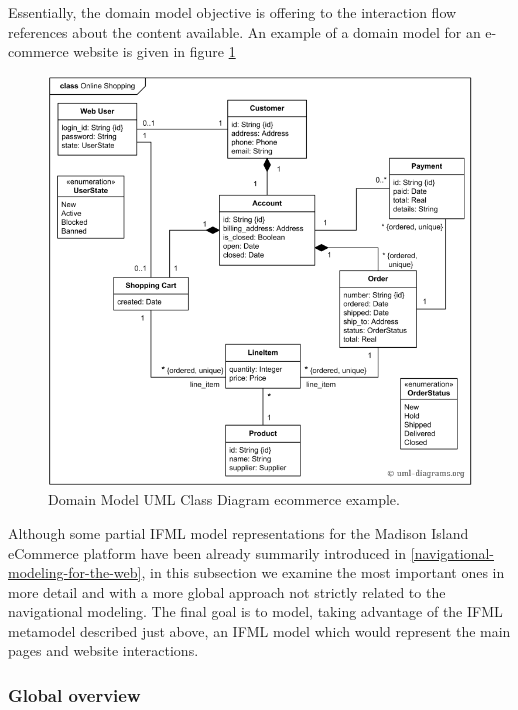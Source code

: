 Essentially, the domain model objective is offering to the interaction flow references about the content available. An example of a domain model for an e-commerce website is given in figure \ref{fig:domain-model-uml-ecommerce}   

\vspace{0.5cm}
\begin{figure}[H]
  \centering
    \includegraphics[width=12cm]{images/diagrams/domain-model-uml-ecommerce.png}
  \caption{Domain Model UML Class Diagram ecommerce example.}
  \label{fig:domain-model-uml-ecommerce}
\end{figure}
\vspace{0.5cm}

Although some partial IFML model representations for the Madison Island eCommerce platform have been already summarily introduced in \ref{navigational-modeling-for-the-web}, in this subsection we examine the most important ones in more detail and with a more global approach not strictly related to the navigational modeling. The final goal is to model, taking advantage of the IFML metamodel described just above, an IFML model which would represent the main pages and website interactions.

\subsubsection{Global overview}

